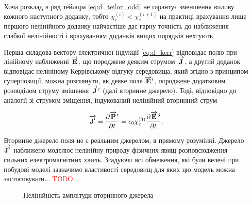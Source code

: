 Хоча розклад в ряд тейлора \eqref{eq:d_teilor_odd} не гарантує зменшення 
впливу кожного наступного доданку, тобто $ \chi_e^{(i)} < \chi_e^{(i+1)} $
на практиці врахування лише першого нелінійного доданку найчастіше дає
гарну точність до наближення слабкої нелінійності і врахуванням доданків
вищих порядків нехтують.

Перша складова вектору електричної індукції \eqref{eq:d_kerr} відповідає 
полю при лінійному наближенні $ \overrightarrow{\mathbf E} $, що породжене деяким 
струмом $ \overrightarrow{\mathbf J} $, а другий доданок відповідає нелініному Керрівському 
відгуку середовища, який згідно з принципом суперпозиції, можна розглянути, 
як деяке поле $ \overrightarrow{\mathbf E}^\prime $, породжене додатковим розподілом струму 
зміщення $ \overrightarrow{\mathbf J}^\prime $ (далі вторинне джерело). Тоді, відповідно до
аналогії зі струмом зміщення, індукований нелінійний вторинний струм

\begin{equation}
\overrightarrow{\mathbf J^\prime} = \frac{\partial \overrightarrow{\mathbf P}^\prime}{\partial t} = 
\epsilon_0 \chi_e^{(3)} \frac{\partial \overrightarrow{\mathbf E}^3}{\partial t}.
\end{equation}

Вторинне джерело поля не є реальним джерелом, в прямому розумінні. 
Джерело $ \overrightarrow{\mathbf J^\prime} $ наближено моделює нелінійну природу фізичних 
явищ розповсюдження сильних електромагнітних хвиль. Згадуючи всі обмеження,
які були велені при побудові моделі зазначимо властивості середовищ для 
яких цю модель можна застосовувати... \textcolor{red}{TODO...}

\begin{figure}
	\centering
	\qquad
	\caption{Нелінійність амплітуди вторинного джерела}
	\label{fig:example}%
\end{figure}


